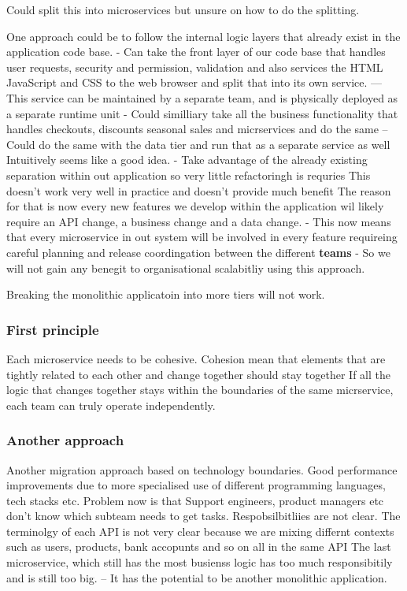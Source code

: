 \documentclass[a4paper, 11pt]{book}
\begin{document}
{    Could split this into microservices but unsure on how to do the splitting.

    One approach could be to follow the internal logic layers that already exist in the application code base.
    - Can take the front layer of our code base that handles user requests, security and permission, validation and also services the HTML JavaScript and CSS to the web browser and split that into its own service.
    --- This service can be maintained by a separate team, and is physically deployed as a separate runtime unit
    - Could similliary take all the business functionality that handles checkouts, discounts seasonal sales and micrservices and do the same
    -- Could do the same with the data tier and run that as a separate service as well
    Intuitively seems like a good idea.
    - Take advantage of the already existing separation within out application so very little refactoringh is requries
    This doesn't work very well in practice and doesn't provide much benefit
    The reason for that is now every new features we develop within the application wil likely require an API change, a business change and a data change.
    - This now means that every microservice in out system will be involved in every feature requireing careful planning and release coordingation between the different \textbf{teams}
    - So we will not gain any benegit to organisational scalabitliy using this approach.

    Breaking the monolithic applicatoin into more tiers will not work.

    \subsubsection{First principle}
    Each microservice needs to be cohesive.
    Cohesion mean that elements that are tightly related to each other and change together should stay together
    If all the logic that changes together stays within the boundaries of the same micrservice, each team can truly operate independently.

    \subsubsection{Another approach}
    Another migration approach based on technology boundaries.
    Good performance improvements due to more specialised use of different programming languages, tech stacks etc.
    Problem now is that Support engineers, product managers etc don't know which subteam needs to get tasks.
    Respobsilbitliies are not clear.
    The terminolgy of each API is not very clear because we are mixing differnt contexts such as users, products, bank accopunts and so on all in the same API
    The last microservice, which still has the most busienss logic has too much responsibitily and is still too big.
    -- It has the potential to be another monolithic application.

}
\end{document}
